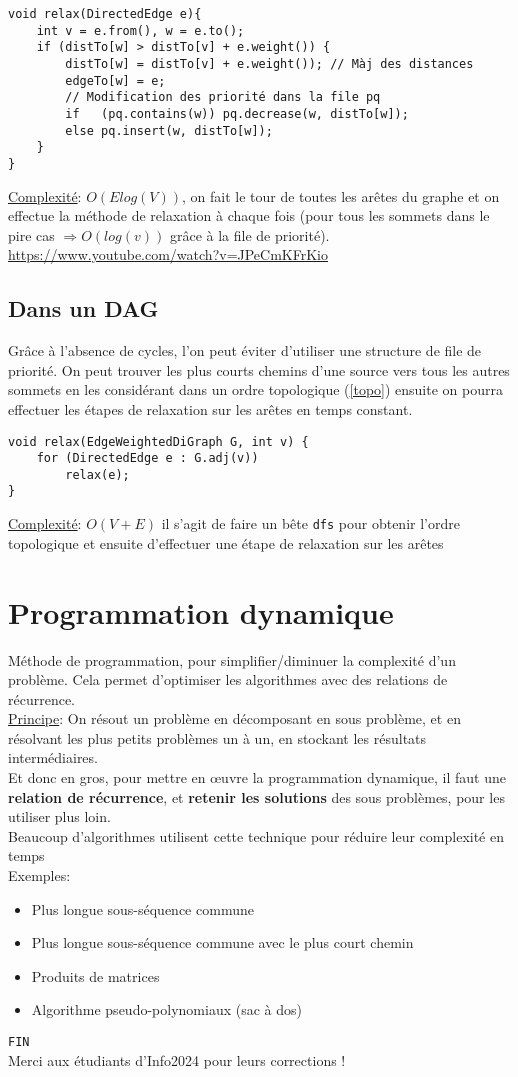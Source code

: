 \documentclass[10pt]{article}
\begin{document}
\begin{verbatim}
void relax(DirectedEdge e){
	int v = e.from(), w = e.to();
	if (distTo[w] > distTo[v] + e.weight()) {
		distTo[w] = distTo[v] + e.weight()); // Màj des distances
		edgeTo[w] = e;
		// Modification des priorité dans la file pq
		if   (pq.contains(w)) pq.decrease(w, distTo[w]); 
		else pq.insert(w, distTo[w]);
	}
}
\end{verbatim}

\underline{Complexité}: $O(Elog(V))$, on fait le tour de toutes les arêtes du graphe et on effectue la méthode de relaxation à chaque fois (pour tous les sommets dans le pire cas $\Rightarrow O(log(v))$ grâce à la file de priorité).
\\\url{https://www.youtube.com/watch?v=JPeCmKFrKio}

\subsection{Dans un DAG}
Grâce à l'absence de cycles, l'on peut éviter d'utiliser une structure de file de priorité. On peut trouver les plus courts chemins d'une source vers tous les autres sommets en les considérant dans un ordre topologique (\ref{topo}) ensuite on pourra effectuer les étapes de relaxation sur les arêtes en temps constant.

\begin{verbatim}
void relax(EdgeWeightedDiGraph G, int v) {
	for (DirectedEdge e : G.adj(v))
		relax(e);
}
\end{verbatim}
\underline{Complexité}: $O(V + E)$ il s'agit de faire un bête \verb|dfs| pour obtenir l'ordre topologique et ensuite d'effectuer une étape de relaxation sur les arêtes
\section{Programmation dynamique}
Méthode de programmation, pour simplifier/diminuer la complexité d’un problème. Cela permet d’optimiser les algorithmes avec des relations de récurrence.
\\\underline{Principe}: On résout un problème en décomposant en sous problème, et en résolvant les plus petits problèmes un à un, en stockant les résultats intermédiaires.
\\Et donc en gros, pour mettre en œuvre la programmation dynamique, il faut une \textbf{relation de récurrence}, et \textbf{retenir les solutions} des sous problèmes, pour les utiliser plus loin.
\\Beaucoup d'algorithmes utilisent cette technique pour réduire leur complexité en temps
\\Exemples:
\begin{itemize}
\item Plus longue sous-séquence commune
\item Plus longue sous-séquence commune avec le plus court chemin
\item Produits de matrices
\item Algorithme pseudo-polynomiaux (sac à dos)
\end{itemize}

\verb|FIN|\\
Merci aux étudiants d'Info2024 pour leurs corrections !
\end{document}
